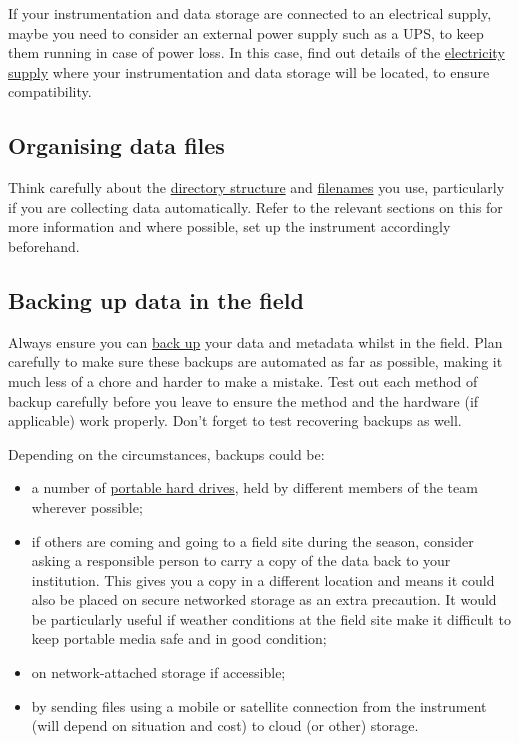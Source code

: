 \documentclass[12pt,a4paper,oneside]{report}
\providecommand{\tightlist}{%
  \setlength{\itemsep}{0pt}\setlength{\parskip}{0pt}}
\begin{document}
If your instrumentation and data storage are connected to an electrical
supply, maybe you need to consider an external power supply such as a
UPS, to keep them running in case of power loss. In this case, find out
details of the
\protect\hyperlink{power-and-electricity-supply}{electricity supply}
where your instrumentation and data storage will be located, to ensure
compatibility.

\hypertarget{organising-data-files}{%
\subsection{Organising data files}\label{organising-data-files}}

Think carefully about the
\protect\hyperlink{directory-structure}{directory structure} and
\protect\hyperlink{file-naming}{filenames} you use, particularly if you
are collecting data automatically. Refer to the relevant sections on
this for more information and where possible, set up the instrument
accordingly beforehand.

\hypertarget{backing-up-data-in-the-field}{%
\subsection{Backing up data in the
field}\label{backing-up-data-in-the-field}}

Always ensure you can \protect\hyperlink{backing-up-data}{back up} your
data and metadata whilst in the field. Plan carefully to make sure these
backups are automated as far as possible, making it much less of a chore
and harder to make a mistake. Test out each method of backup carefully
before you leave to ensure the method and the hardware (if applicable)
work properly. Don't forget to test recovering backups as well.

Depending on the circumstances, backups could be:

\begin{itemize}
\tightlist
\item
  a number of \protect\hyperlink{portable-media}{portable hard drives},
  held by different members of the team wherever possible;
\item
  if others are coming and going to a field site during the season,
  consider asking a responsible person to carry a copy of the data back
  to your institution. This gives you a copy in a different location and
  means it could also be placed on secure networked storage as an extra
  precaution. It would be particularly useful if weather conditions at
  the field site make it difficult to keep portable media safe and in
  good condition;
\item
  on network-attached storage if accessible;
\item
  by sending files using a mobile or satellite connection from the
  instrument (will depend on situation and cost) to cloud (or other)
  storage.
\end{itemize}
\end{document}
